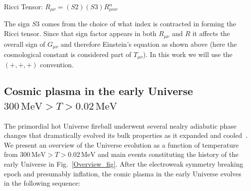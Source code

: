 Ricci Tensor: $R_{\mu\nu}=(S2)(S3)R^\alpha_{\mu\alpha\nu}$
\vspace{3mm}

\noindent The sign $S3$ comes from the choice of what index is contracted in forming the Ricci tensor. Since that sign factor appears in both $R_{\mu\nu}$ and $R$ it affects the overall sign of $G_{\mu\nu}$ and therefore Einstein's equation as shown above (here the cosmological constant is considered part of $T_{\mu\nu}$). In this work we will use the $(+,+,+)$ convention.

\subsection{Cosmic plasma in the early Universe $300\,\mathrm{MeV}>T>0.02\,\mathrm{MeV}$}

The primordial hot Universe fireball underwent several nealry adiabatic phase changes that dramatically evolved its bulk properties as it expanded and cooled~\cite{Rafelski:2023emw}. 
We present an overview of the Universe evolution as a function of temperature from $300\,\mathrm{MeV}>T>0.02\,\mathrm{MeV}$ and main events constituting the history of the early Universe in Fig.~\ref{Overview_fig}. After the electroweak symmetry breaking epoch and presumably inflation, the comic plasma in the early Universe evolves in the following sequence:

